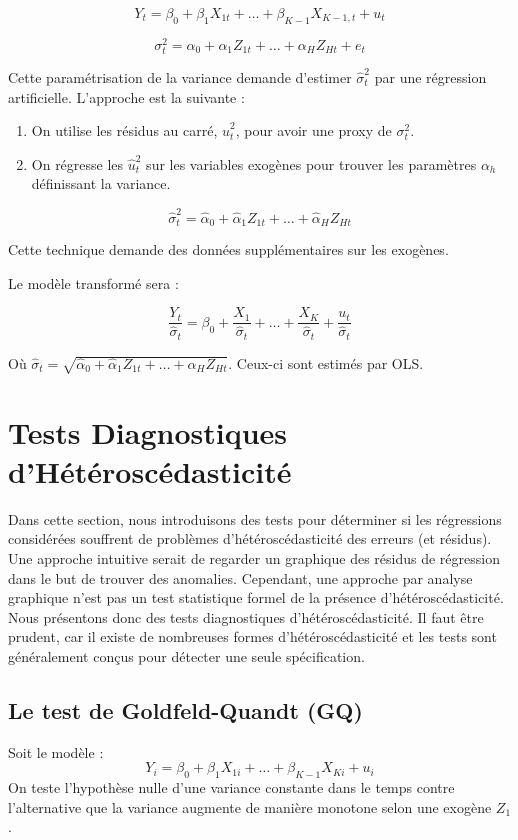 \documentclass[14pt]{extarticle} %
\theoremstyle{definition}
\theoremstyle{plain}
\begin{document}
\[
Y_t = \beta_0 + \beta_1 X_{1t} + \dots + \beta_{K-1} X_{K-1,t} + u_t
\]

\[
\sigma_t^2 = \alpha_0 + \alpha_1 Z_{1t} + \dots + \alpha_H Z_{Ht} + e_t
\]

Cette paramétrisation de la variance demande d’estimer $\hat{\sigma}_t^2$ par une régression artificielle. L’approche est la suivante :

\begin{enumerate}
    \item On utilise les résidus au carré, $\hat{u}_t^2$, pour avoir une proxy de $\sigma_t^2$.
    \item On régresse les $\hat{u}_t^2$ sur les variables exogènes pour trouver les paramètres $\alpha_h$ définissant la variance.
\end{enumerate}

\[
\hat{\sigma}_t^2 = \hat{\alpha}_0 + \hat{\alpha}_1 Z_{1t} + \dots + \hat{\alpha}_H Z_{Ht}
\]

Cette technique demande des données supplémentaires sur les exogènes.

Le modèle transformé sera :

\[
\frac{Y_t}{\hat{\sigma}_t} = \beta_0 + \frac{X_1}{\hat{\sigma}_t} + \dots + \frac{X_K}{\hat{\sigma}_t} + \frac{u_t}{\hat{\sigma}_t}
\]

Où $\hat{\sigma}_t = \sqrt{\hat{\alpha}_0 + \hat{\alpha}_1 Z_{1t} + \dots + \hat{\alpha}_H Z_{Ht}}$. Ceux-ci sont estimés par OLS.

\section{Tests Diagnostiques d'Hétéroscédasticité}
Dans cette section, nous introduisons des tests pour déterminer si les régressions considérées souffrent de problèmes d’hétéroscédasticité des erreurs (et résidus). Une approche intuitive serait de regarder un graphique des résidus de régression dans le but de trouver des anomalies. Cependant, une approche par analyse graphique n’est pas un test statistique formel de la présence d’hétéroscédasticité. Nous présentons donc des tests diagnostiques d’hétéroscédasticité. Il faut être prudent, car il existe de nombreuses formes d’hétéroscédasticité et les tests sont généralement conçus pour détecter une seule spécification.

\subsection{Le test de Goldfeld-Quandt (GQ)}
Soit le modèle :
\[
Y_i = \beta_0 + \beta_1 X_{1i} + \dots + \beta_{K-1} X_{Ki} + u_i
\]
On teste l’hypothèse nulle d’une variance constante dans le temps contre l’alternative que la variance augmente de manière monotone selon une exogène $Z_1$.
\end{document}
